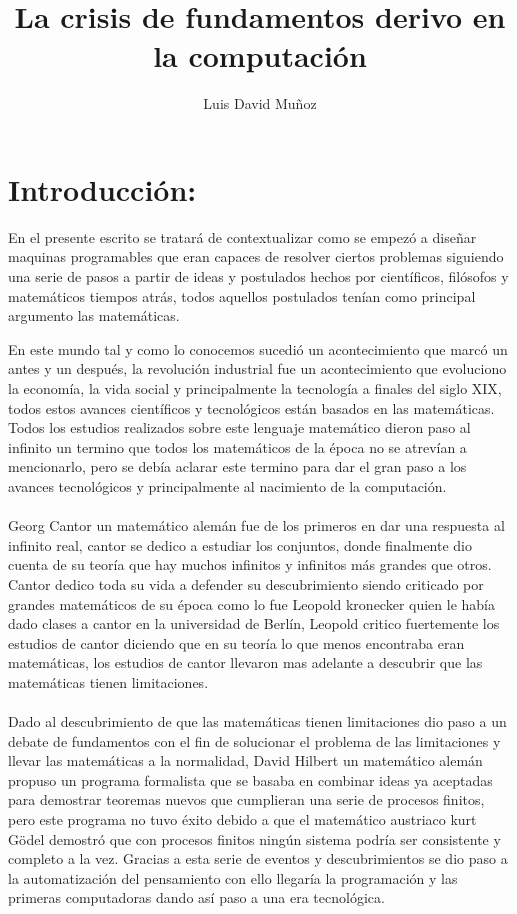 \documentclass[12pt]{article}
\title{La crisis de fundamentos derivo en la computación }
\author{Luis David Muñoz }
\begin{document}
\maketitle
\section{Introducción: }

En el presente escrito se tratará de contextualizar como se empezó a diseñar maquinas programables que eran capaces de resolver ciertos problemas siguiendo una serie de pasos a partir de ideas y postulados hechos por científicos, filósofos y matemáticos tiempos atrás, todos aquellos postulados tenían como principal argumento las matemáticas.

\newpage
En este mundo tal y como lo conocemos sucedió un acontecimiento que marcó un antes y un después, la revolución industrial fue un acontecimiento que evoluciono la economía, la vida social y principalmente la tecnología a finales del siglo XIX, todos estos avances científicos y tecnológicos están basados en las matemáticas.
Todos los estudios realizados sobre este lenguaje matemático dieron paso al infinito un termino que todos los matemáticos de la época no se atrevían a mencionarlo, pero se debía aclarar este termino para dar el gran paso a los avances tecnológicos y principalmente al nacimiento de la computación. 
\\\\
Georg Cantor un matemático alemán fue de los primeros en dar una respuesta al infinito real, cantor se dedico a estudiar los conjuntos, donde finalmente dio cuenta de su teoría que hay muchos infinitos y infinitos más grandes que otros. Cantor dedico toda su vida a defender su descubrimiento siendo criticado por grandes matemáticos de su época como lo fue Leopold kronecker quien le había dado clases a cantor en la universidad de Berlín, Leopold critico fuertemente los estudios de cantor diciendo que en su teoría lo que menos encontraba eran matemáticas, los estudios de cantor llevaron mas adelante a descubrir que las matemáticas tienen limitaciones.
\\\\
Dado al descubrimiento de que las matemáticas tienen limitaciones dio paso a un debate de fundamentos con el fin de solucionar el problema de las limitaciones y llevar las matemáticas a la normalidad, David Hilbert un matemático alemán propuso un programa formalista que se basaba en combinar ideas ya aceptadas para demostrar teoremas nuevos que cumplieran una serie de procesos finitos, pero este programa no tuvo éxito debido a que el matemático austriaco kurt Gödel demostró que con procesos finitos ningún sistema podría ser consistente y completo a la vez. Gracias a esta serie de eventos y descubrimientos se dio paso a la automatización del pensamiento con ello llegaría la programación y las primeras computadoras dando así paso a una era tecnológica.
\end{document}

